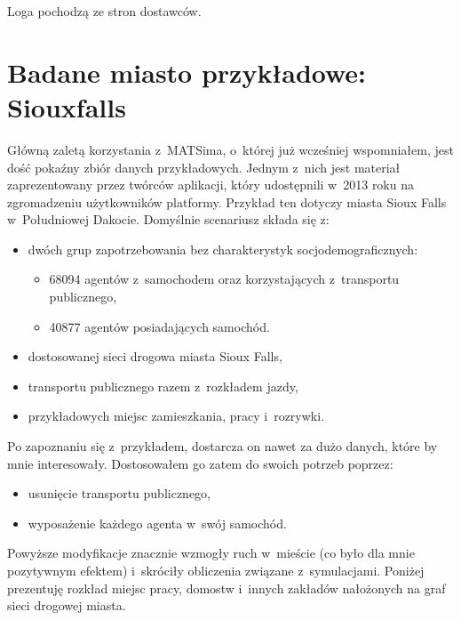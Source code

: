 \documentclass[twoside,12pt]{report}
\begin{document}
Loga pochodzą ze stron dostawców\cite{java}\cite{eclipse}\cite{python}\cite{pydev}.

\section{Badane miasto przykładowe: Siouxfalls}

Główną zaletą korzystania z~MATSima, o~której już wcześniej wspomniałem, jest dość pokaźny zbiór danych przykładowych. Jednym z~nich jest materiał zaprezentowany przez twórców aplikacji, który udostępnili w~2013 roku na zgromadzeniu użytkowników platformy\cite{siux}. Przykład ten dotyczy miasta Sioux Falls w~Południowej Dakocie. Domyślnie scenariusz składa się z:

\begin{itemize}
\item dwóch grup zapotrzebowania bez charakterystyk socjodemograficznych:
\begin{itemize}
\item 68094 agentów z~samochodem oraz korzystających z~transportu publicznego,
\item 40877 agentów posiadających samochód.
\end{itemize}
\item dostosowanej sieci drogowa miasta Sioux Falls,
\item transportu publicznego razem z~rozkładem jazdy,
\item przykładowych miejsc zamieszkania, pracy i~rozrywki.
\end{itemize}

\vspace*{20px}
Po zapoznaniu się z~przykładem, dostarcza on nawet za dużo danych, które by mnie interesowały. Dostosowałem go zatem do swoich potrzeb poprzez:

\begin{itemize}
\item usunięcie transportu publicznego,
\item wyposażenie każdego agenta w~swój samochód.
\end{itemize}

Powyższe modyfikacje znacznie wzmogły ruch w~mieście (co było dla mnie pozytywnym efektem) i~skróciły obliczenia związane z~symulacjami. Poniżej prezentuję  rozkład miejsc pracy, domostw i~innych zakładów nałożonych na graf sieci drogowej miasta.
\end{document}
